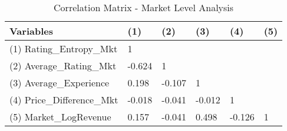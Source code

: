 \begin{table}[H]
\centering
\begin{tabular}{@{}llllll@{}}
\toprule
Variables                & (1)    & (2)    & (3)    & (4)    & (5) \\ \midrule
(1) Rating\_Entropy\_Mkt & 1      &        &        &        &     \\
(2) Average\_Rating\_Mkt & -0.624 & 1      &        &        &     \\
(3) Average\_Experience  & 0.198  & -0.107 & 1      &        &     \\
(4) Price\_Difference\_Mkt    & -0.018 & -0.041 & -0.012 & 1      &     \\
(5) Market\_LogRevenue   & 0.157  & -0.041 & 0.498  & -0.126 & 1   \\ \bottomrule
\end{tabular}
\caption{Correlation Matrix - Market Level Analysis}
\label{corr_mkt}
\end{table} 